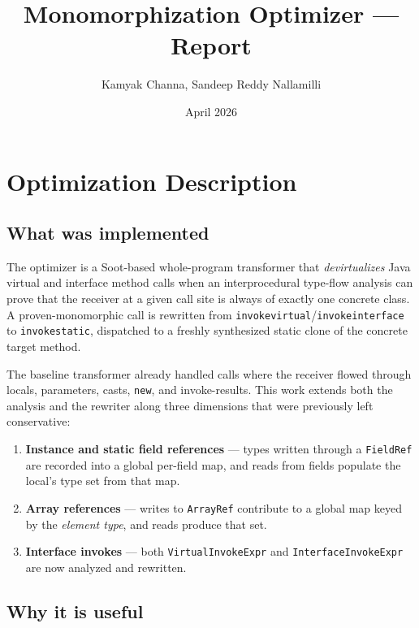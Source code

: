 \documentclass[11pt,a4paper]{article}
\title{\vspace{-2em}Monomorphization Optimizer --- Report}
\author{Kamyak Channa, Sandeep Reddy Nallamilli}
\date{April 2026}
\begin{document}
\maketitle
\vspace{-1.5em}

\section{Optimization Description}

\subsection*{What was implemented}

The optimizer is a Soot-based whole-program transformer that
\emph{devirtualizes} Java virtual and interface method calls when an
interprocedural type-flow analysis can prove that the receiver at a given
call site is always of exactly one concrete class. A proven-monomorphic
call is rewritten from \texttt{invokevirtual}/\texttt{invokeinterface} to
\texttt{invokestatic}, dispatched to a freshly synthesized static clone of
the concrete target method.

The baseline transformer already handled calls where the receiver flowed
through locals, parameters, casts, \texttt{new}, and invoke-results. This
work extends both the analysis and the rewriter along three dimensions
that were previously left conservative:

\begin{enumerate}[topsep=2pt,itemsep=0pt]
  \item \textbf{Instance and static field references} --- types written
    through a \texttt{FieldRef} are recorded into a global per-field map,
    and reads from fields populate the local's type set from that map.
  \item \textbf{Array references} --- writes to \texttt{ArrayRef}
    contribute to a global map keyed by the \emph{element type}, and
    reads produce that set.
  \item \textbf{Interface invokes} --- both \texttt{VirtualInvokeExpr} and
    \texttt{InterfaceInvokeExpr} are now analyzed and rewritten.
\end{enumerate}

\subsection*{Why it is useful}
\end{document}
